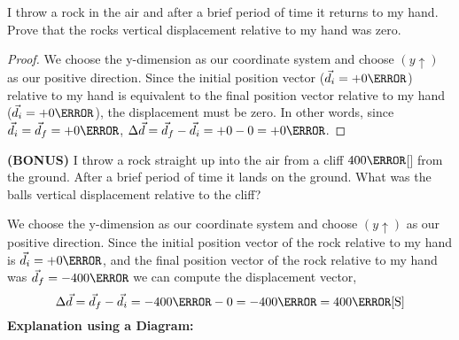 \documentclass[12pt]{article} %
\newcommand{\tx}[1]{\text{#1}}
\begin{document}
\begin{qstn}[7]
    I throw a rock in the air and after a brief period of time it returns to my hand. Prove that the rocks vertical displacement relative to my hand was zero.
    \begin{soln}
        \begin{proof}
            We choose the y-dimension as our coordinate system and choose $(y \uparrow)$ as our positive direction. Since the initial position vector ($\vec d_i = +0\m$) relative to my hand is equivalent to the final position vector relative to my hand ($\vec d_i = +0\m$), the displacement must be zero. In other words, since $\vec d_i = \vec d_f = +0\m$, $\Delta \vec d = \vec d_f - \vec d_i = +0 - 0 = +0\m$.
        \end{proof}
        \vspace*{13cm}
    \end{soln} 
\end{qstn}

\begin{qstn}[8]
   \textbf{(BONUS)} I throw a rock straight up into the air from a cliff $400\m$[\tx{N}] from the ground. After a brief period of time it lands on the ground. What was the balls vertical displacement relative to the cliff?
   \begin{soln}
           We choose the y-dimension as our coordinate system and choose $(y \uparrow)$ as our positive direction. Since the initial position vector of the rock relative to my hand is $\vec d_i = +0\m$, and the final position vector of the rock relative to my hand was $\vec d_f = -400\m$ we can compute the displacement vector,
           $$\Delta \vec d = \vec d_f - \vec d_i = -400\m - 0 = -400\m = 400\m\tx{[S]}$$
           \textbf{Explanation using a Diagram: }
        \vspace*{13cm}
   \end{soln} 
\end{qstn}
\end{document}
